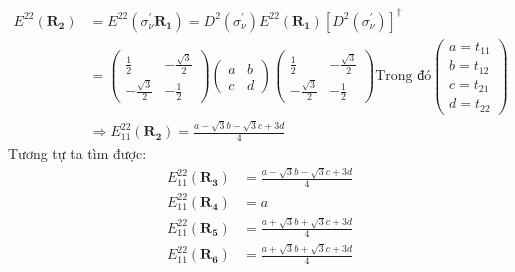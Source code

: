 \documentclass{report}
\begin{document}
\begin{align*}
	E^{22} (\mathbf{R_2}) & = E^{22}(\sigma_\nu^{'} \mathbf{R_1}) = D^2(\sigma^{'}_\nu) E^{22} (\mathbf{R_1}) [D^2(\sigma_\nu ^{'})]^\dagger \\
	                      & =
	\begin{pmatrix}
		\frac{1}{2}         & -\frac{\sqrt{3}}{2} \\
		-\frac{\sqrt{3}}{2} & -\frac{1}{2}
	\end{pmatrix} \begin{pmatrix}
		              a & b \\
		              c & d
	              \end{pmatrix}\begin{pmatrix}
		                           \frac{1}{2}         & -\frac{\sqrt{3}}{2} \\
		                           -\frac{\sqrt{3}}{2} & -\frac{1}{2}
	                           \end{pmatrix}\text{Trong đó}\begin{pmatrix}
		                                                       a = t_{11} \\
		                                                       b = t_{12} \\
		                                                       c = t_{21} \\
		                                                       d = t_{22}
	                                                       \end{pmatrix}                                                      \\
	                      & \Rightarrow E^{22}_{11} (\mathbf{R_2}) = \frac{a - \sqrt{3}b - \sqrt{3}c + 3d}{4}
\end{align*}
Tương tự ta tìm được:
\begin{align*}
	E^{22}_{11} (\mathbf{R_3}) & = \frac{a - \sqrt{3}b - \sqrt{3}c + 3d}{4} \\
	E^{22}_{11} (\mathbf{R_4}) & = a                                        \\
	E^{22}_{11} (\mathbf{R_5}) & = \frac{a + \sqrt{3}b + \sqrt{3}c + 3d}{4} \\
	E^{22}_{11} (\mathbf{R_6}) & = \frac{a + \sqrt{3}b + \sqrt{3}c + 3d}{4} \\
\end{align*}
\end{document}
